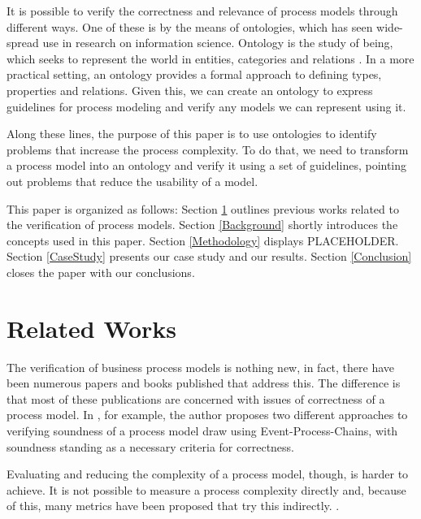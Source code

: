 \documentclass{llncs}
\begin{document}
It is possible to verify the correctness and relevance of process models through different ways. One of these is by the means of ontologies, which has seen wide-spread use in research on information science. Ontology is the study of being, which seeks to represent the world in entities, categories and relations \cite{Mendling2008}. In a more practical setting, an ontology provides a formal approach to defining types, properties and relations. Given this, we can create an ontology to express guidelines for process modeling and verify any models we can represent using it.


Along these lines, the purpose of this paper is to use ontologies to identify problems that increase the process complexity. To do that, we need to transform a process model into an ontology and verify it using a set of guidelines, pointing out problems that reduce the usability of a model.


This paper is organized as follows: Section \ref{RelatedWorks} outlines previous works related to the verification of process models. Section \ref{Background} shortly introduces the concepts used in this paper. Section \ref{Methodology} displays PLACEHOLDER. Section \ref{CaseStudy} presents our case study and our results. Section \ref{Conclusion} closes the paper with our conclusions.

\section{Related Works}\label{RelatedWorks}


The verification of business process models is nothing new, in fact, there have been numerous papers and books published that address this. The difference is that most of these publications are concerned with issues of correctness of a process model. In \cite{Mendling2008}, for example, the author proposes two different approaches to verifying soundness of a process model draw using Event-Process-Chains, with soundness standing as a necessary criteria for correctness.

		
Evaluating and reducing the complexity of a process model, though, is harder to achieve. It is not possible to measure a process complexity directly and, because of this, many metrics have been proposed that try this indirectly. \cite{?}. 
\end{document}
